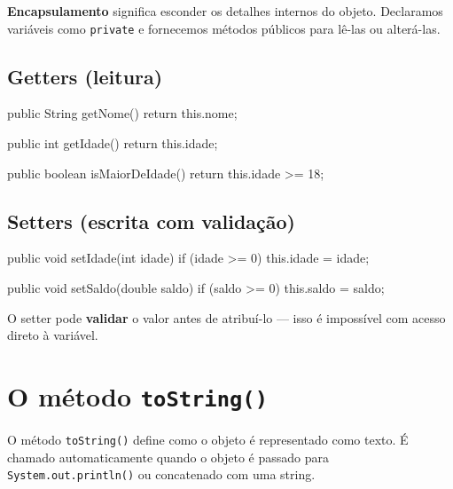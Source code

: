 \documentclass[12pt, a4paper]{article}
\newcommand{\code}[1]{\texttt{\color{javaDeep}#1}}
\begin{document}
\textbf{Encapsulamento} significa esconder os detalhes internos do objeto. Declaramos variáveis como \code{private} e fornecemos métodos públicos para lê-las ou alterá-las.

\subsection{Getters (leitura)}

\begin{javacode}
public String getNome() {
    return this.nome;
}

public int getIdade() {
    return this.idade;
}

public boolean isMaiorDeIdade() {
    return this.idade >= 18;
}
\end{javacode}

\subsection{Setters (escrita com validação)}

\begin{javacode}
public void setIdade(int idade) {
    if (idade >= 0) {
        this.idade = idade;
    }
}

public void setSaldo(double saldo) {
    if (saldo >= 0) {
        this.saldo = saldo;
    }
}
\end{javacode}

O setter pode \textbf{validar} o valor antes de atribuí-lo --- isso é impossível com acesso direto à variável.

\section{O método \texttt{toString()}}

O método \code{toString()} define como o objeto é representado como texto. É chamado automaticamente quando o objeto é passado para \code{System.out.println()} ou concatenado com uma string.


\end{document}
